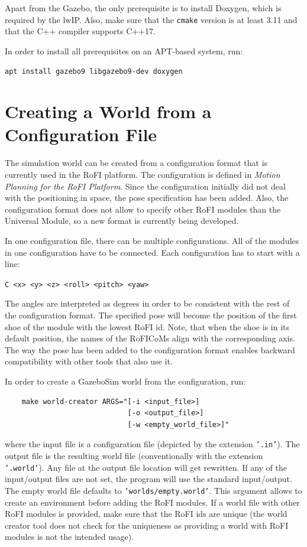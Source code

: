 \documentclass[
  printed, %
  color,   %
  notable, %
  oneside, %
  nolof,   %
  nolot,   %
  nocover,
]{fithesis3}
\newcommand{\code}[1]{\texttt{#1}}
\begin{document}
Apart from the Gazebo, the only prerequisite is to install Doxygen, which is required by the lwIP.
Also, make sure that the \code{cmake} version is at least 3.11 and that the C++ compiler supports C++17.

In order to install all prerequisites on an APT-based system, run:\\
\centerline{\code{apt install gazebo9 libgazebo9-dev doxygen}}

\section{Creating a World from a Configuration File}

The simulation world can be created from a configuration format that is currently used in the RoFI platform.
The configuration is defined in \emph{Motion Planning for the RoFI Platform}\cite[p. 71]{motion-planning-thesis}.
Since the configuration initially did not deal with the positioning in space, the pose specification has been added.
Also, the configuration format does not allow to specify other RoFI modules than the Universal Module, so a new format is currently being developed.

In one configuration file, there can be multiple configurations.
All of the modules in one configuration have to be connected.
Each configuration has to start with a line:\\
\centerline{\code{C <x> <y> <z> <roll> <pitch> <yaw>}}

The angles are interpreted as degrees in order to be consistent with the rest of the configuration format.
The specified pose will become the position of the first shoe of the module with the lowest RoFI id.
Note, that when the shoe is in its default position, the names of the RoFICoMs align with the corresponding axis.
The way the pose has been added to the configuration format enables backward compatibility with other tools that also use it.

In order to create a GazeboSim world from the configuration, run:
\begin{center}
\begin{verbatim}
    make world-creator ARGS="[-i <input_file>]
                             [-o <output_file>]
                             [-w <empty_world_file>]"
\end{verbatim}
\end{center}
where the input file is a configuration file (depicted by the extension \code{'.in'}).
The output file is the resulting world file (conventionally with the extension \code{'.world'}).
Any file at the output file location will get rewritten.
If any of the input/output files are not set, the program will use the standard input/output.
The empty world file defaults to \code{'worlds/empty.world'}.
This argument allows to create an environment before adding the RoFI modules.
If a world file with other RoFI modules is provided, make sure that the RoFI ids are unique (the world creator tool does not check for the uniqueness as providing a world with RoFI modules is not the intended usage).
\end{document}
